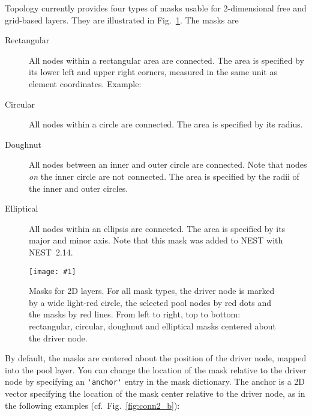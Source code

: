 \documentclass[a4paper,12pt]{report}
\newcommand{\scriptfig}[4]{%
\begin{figure}
\centerline{\texttt{[image: \#1]}}
\caption[#3]{#4}
\label{fig:#1}
\end{figure}%
}
\begin{document}
Topology currently provides four types of masks usable for 2-dimensional
free and grid-based layers. They are illustrated in Fig.~\ref{fig:conn2_a}.
The masks are
\begin{description}
\item[Rectangular] All nodes within a rectangular
  area are connected. The area is specified by its lower left and
  upper right corners, measured in the same unit as element
  coordinates. Example:

\item[Circular] All nodes within a circle are
  connected.  The area is specified by its radius.

\item[Doughnut] All nodes between an inner and outer
  circle are connected. Note that nodes \emph{on} the inner circle are
  not connected. The area is specified by the radii of the inner and
  outer circles.

\item[Elliptical] All nodes within an ellipsis are connected.
  The area is specified by its major and minor axis. Note that this mask was
  added to NEST with NEST~2.14.

\end{description}

\scriptfig{conn2_a}{0.9}{Masks for 2D layers}%
{Masks for 2D layers. For all mask types, the driver node is
  marked by a wide light-red circle, the selected pool nodes by red
  dots and the masks by red lines. From left to right, top to bottom:
  rectangular, circular, doughnut and elliptical masks centered about the driver
  node.}

\noindent By default, the masks are centered about the position of the driver
node, mapped into the pool layer. You can change the location of the
mask relative to the driver node by specifying an
\lstinline!'anchor'! entry in the mask dictionary. The
anchor is a 2D vector specifying the location of the mask center
relative to the driver node, as in the following examples (cf.\
Fig.~\ref{fig:conn2_b}):




\end{document}
